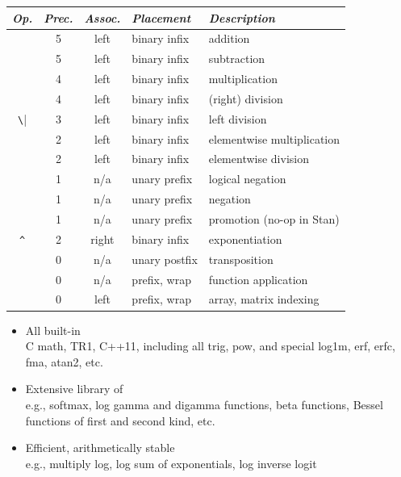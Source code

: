 \documentclass[10pt]{report}
\begin{document}
\vfill
\noindent\spc
{\footnotesize
  \begin{tabular}{c|ccl|l}
    {\it Op.} & {\it Prec.} & {\it Assoc.} & {\it
      Placement} & {\it Description}
    \\ \hline \hline

    \code{+} & 5 & left & binary infix & addition
    \\
    \code{-} & 5 & left & binary infix & subtraction
    \\ \hline
    \code{*} & 4 & left & binary infix & multiplication
    \\
    \code{/} & 4 & left & binary infix & (right) division
    \\ \hline
    \Verb|\| & 3 & left & binary infix & left division
    \\ \hline
    \code{.*} & 2 & left & binary infix & elementwise multiplication
    \\
    \code{./} & 2 & left & binary infix & elementwise division
    \\ \hline
    \code{!} & 1 & n/a & unary prefix & logical negation
    \\
    \code{-} & 1 & n/a & unary prefix & negation
    \\ 
    \code{+} & 1 & n/a & unary prefix & promotion (no-op in Stan)
    \\ \hline
    \Verb|^| & 2 & right & binary infix & exponentiation
    \\ \hline
    \code{'} & 0 & n/a & unary postfix & transposition
    \\ \hline \hline
    \code{()} & 0 & n/a & prefix, wrap & function application
    \\
    \code{[]} & 0 & left & prefix, wrap & array, matrix indexing
  \end{tabular}
}
\vfill


\begin{itemize}
\item All built-in 
  \\
  {\footnotesize C math, TR1, C++11, including all trig, pow, and
    special log1m, erf, erfc, fma, atan2, etc.}
\item Extensive library of 
  \\
  {\footnotesize e.g., softmax,
    log gamma and digamma functions, beta functions, Bessel functions of
    first and second kind, etc.}
\item Efficient, arithmetically stable 
  \\
  {\footnotesize e.g., multiply log, log sum of
    exponentials, log inverse logit}
\end{itemize}
\end{document}
